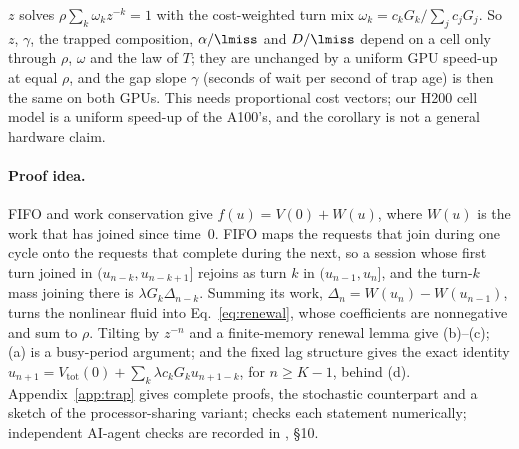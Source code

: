 \begin{corollary}[invariance]\label{cor:trapinv}
$z$ solves $\rho\sum_k\omega_kz^{-k}=1$ with the cost-weighted turn mix $\omega_k=c_kG_k/\sum_jc_jG_j$. So $z$, $\gamma$, the
trapped composition, $\alpha/\lmiss$ and $D/\lmiss$ depend on a cell only through $\rho$, $\omega$ and the law of $T$; they are
unchanged by a uniform GPU speed-up at equal $\rho$, and the gap slope $\gamma$ (seconds of wait per second of trap age) is
then the same on both GPUs. This needs proportional cost vectors; our H200 cell model is a uniform speed-up of the A100's, and the
corollary is not a general hardware claim.
\end{corollary}

\paragraph{Proof idea.} FIFO and work conservation give $f(u)=V(0)+W(u)$, where $W(u)$ is the work that has joined since
time~0. FIFO maps the requests that join during one cycle onto the requests that complete during the next, so a session
whose first turn joined in $(u_{n-k},u_{n-k+1}]$ rejoins as turn $k$ in $(u_{n-1},u_n]$, and the turn-$k$ mass joining there
is $\lambda G_k\Delta_{n-k}$. Summing its work, $\Delta_n=W(u_n)-W(u_{n-1})$, turns the nonlinear fluid into
Eq.~\eqref{eq:renewal}, whose coefficients are nonnegative and sum to $\rho$. Tilting by
$z^{-n}$ and a finite-memory renewal lemma give (b)--(c); (a) is a busy-period argument; and the fixed lag structure gives the
exact identity $u_{n+1}=V_{\mathrm{tot}}(0)+\sum_k\lambda c_kG_ku_{n+1-k}$, for $n\ge K-1$, behind (d). Appendix~\ref{app:trap} gives
complete proofs, the stochastic counterpart and a sketch of the processor-sharing variant; 
checks each statement numerically; independent AI-agent checks are recorded in , \S10.

